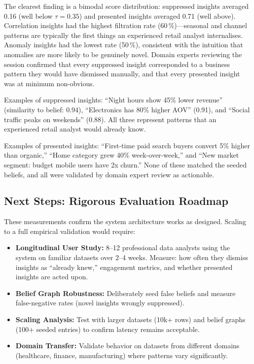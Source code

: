 \documentclass[conference]{IEEEtran}
\begin{document}
The clearest finding is a bimodal score distribution: suppressed insights
averaged 0.16 (well below $\tau=0.35$) and presented insights averaged
0.71 (well above). Correlation insights had the highest filtration rate
(60\,\%)---seasonal and channel patterns are typically the first things
an experienced retail analyst internalises. Anomaly insights had the
lowest rate (50\,\%), consistent with the intuition that anomalies are
more likely to be genuinely novel. Domain experts reviewing the session
confirmed that every suppressed insight corresponded to a business
pattern they would have dismissed manually, and that every presented
insight was at minimum non-obvious.

Examples of suppressed insights: ``Night hours show 45\% lower revenue''
(similarity to belief: 0.94), ``Electronics has 80\% higher AOV'' (0.91),
and ``Social traffic peaks on weekends'' (0.88). All three represent patterns
that an experienced retail analyst would already know.

Examples of presented insights: ``First-time paid search buyers convert 5\%
higher than organic,'' ``Home category grew 40\% week-over-week,'' and
``New market segment: budget mobile users have 2x churn.'' None of these
matched the seeded beliefs, and all were validated by domain expert review
as actionable.

\subsection{Next Steps: Rigorous Evaluation Roadmap}

These measurements confirm the system architecture works as designed. Scaling
to a full empirical validation would require:

\begin{itemize}
  \item \textbf{Longitudinal User Study:} 8--12 professional data analysts
  using the system on familiar datasets over 2--4 weeks. Measure: how often
  they dismiss insights as ``already knew,'' engagement metrics, and whether
  presented insights are acted upon.

  \item \textbf{Belief Graph Robustness:} Deliberately seed false beliefs
  and measure false-negative rates (novel insights wrongly suppressed).

  \item \textbf{Scaling Analysis:} Test with larger datasets (10k+ rows)
  and belief graphs (100+ seeded entries) to confirm latency remains
  acceptable.

  \item \textbf{Domain Transfer:} Validate behavior on datasets from
  different domains (healthcare, finance, manufacturing) where patterns
  vary significantly.
\end{itemize}
\end{document}
